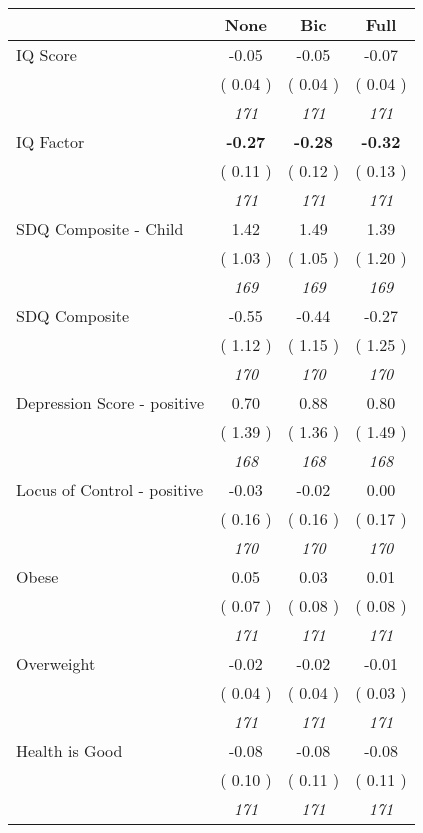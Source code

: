 \begin{tabular}{l c c c}
\toprule
 & None & Bic & Full \\
\midrule
IQ Score &     -0.05 &     -0.05 &     -0.07 \\
& (     0.04 ) & (     0.04 ) & (     0.04 ) \\
& \textit{ 171 } & \textit{ 171 } & \textit{ 171 } \\
IQ Factor & \textbf{     -0.27 } & \textbf{     -0.28 } & \textbf{     -0.32 } \\
& (     0.11 ) & (     0.12 ) & (     0.13 ) \\
& \textit{ 171 } & \textit{ 171 } & \textit{ 171 } \\
SDQ Composite - Child &      1.42 &      1.49 &      1.39 \\
& (     1.03 ) & (     1.05 ) & (     1.20 ) \\
& \textit{ 169 } & \textit{ 169 } & \textit{ 169 } \\
SDQ Composite &     -0.55 &     -0.44 &     -0.27 \\
& (     1.12 ) & (     1.15 ) & (     1.25 ) \\
& \textit{ 170 } & \textit{ 170 } & \textit{ 170 } \\
Depression Score - positive &      0.70 &      0.88 &      0.80 \\
& (     1.39 ) & (     1.36 ) & (     1.49 ) \\
& \textit{ 168 } & \textit{ 168 } & \textit{ 168 } \\
Locus of Control - positive &     -0.03 &     -0.02 &      0.00 \\
& (     0.16 ) & (     0.16 ) & (     0.17 ) \\
& \textit{ 170 } & \textit{ 170 } & \textit{ 170 } \\
Obese &      0.05 &      0.03 &      0.01 \\
& (     0.07 ) & (     0.08 ) & (     0.08 ) \\
& \textit{ 171 } & \textit{ 171 } & \textit{ 171 } \\
Overweight &     -0.02 &     -0.02 &     -0.01 \\
& (     0.04 ) & (     0.04 ) & (     0.03 ) \\
& \textit{ 171 } & \textit{ 171 } & \textit{ 171 } \\
Health is Good &     -0.08 &     -0.08 &     -0.08 \\
& (     0.10 ) & (     0.11 ) & (     0.11 ) \\
& \textit{ 171 } & \textit{ 171 } & \textit{ 171 } \\

\end{tabular}
